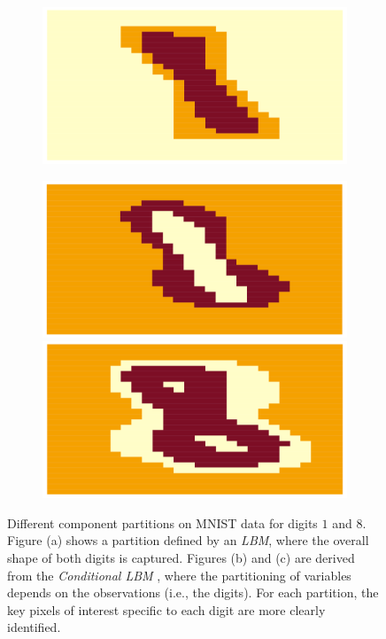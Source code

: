 \begin{figure}[!ht]
     \centering
     \begin{subfigure}[b]{0.49\textwidth}
         \centering
         \includegraphics[width=\textwidth]{Figures/MNIST_LBM.png}
         \vspace{1.6cm}
         \caption{}
     \end{subfigure}
     \hfill
     \begin{subfigure}[b]{0.49\textwidth}
         \centering
         \includegraphics[width=\textwidth]{Figures/MNIST_cocoLBM_1.png}
         \caption{}
         \centering
         \includegraphics[width=\textwidth]{Figures/MNIST_cocoLBM_8.png}
         \caption{}
     \end{subfigure}
     \caption{Different component partitions on MNIST data for digits $1$ and $8$. Figure (a) shows a partition defined by an \textit{LBM}, where the overall shape of both digits is captured. Figures (b) and (c) are derived from the \textit{Conditional LBM} \citep{goffinet2020conditional}, where the partitioning of variables depends on the observations (i.e., the digits). For each partition, the key pixels of interest specific to each digit are more clearly identified.}
     \label{fig: CoCoLBM_MNIST}
\end{figure}


